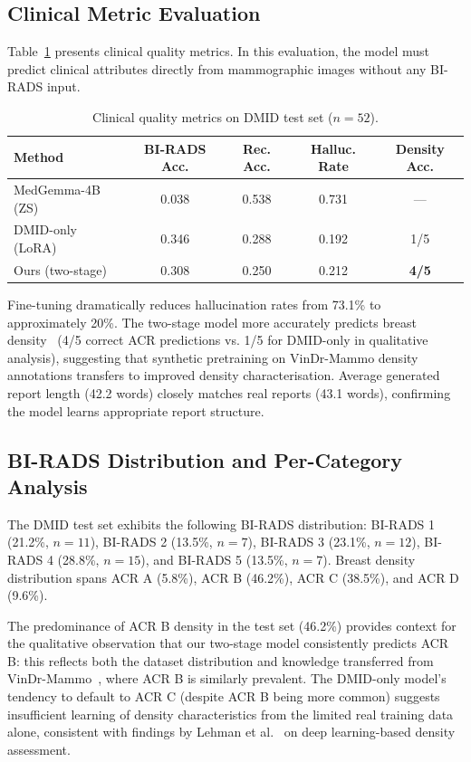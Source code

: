 \documentclass{wlscirep}
\begin{document}
\subsection*{Clinical Metric Evaluation}

Table~\ref{tab:clinical} presents clinical quality metrics. In this evaluation, the model must predict clinical attributes directly from mammographic images without any BI-RADS input.

\begin{table}[H]
\centering
\caption{Clinical quality metrics on DMID test set ($n=52$).}
\label{tab:clinical}
\begin{tabular}{lcccc}
\toprule
\textbf{Method} & \textbf{BI-RADS Acc.} & \textbf{Rec. Acc.} & \textbf{Halluc. Rate} & \textbf{Density Acc.} \\
\midrule
MedGemma-4B (ZS)     & 0.038 & 0.538 & 0.731 & ---   \\
DMID-only (LoRA)      & 0.346 & 0.288 & 0.192 & 1/5   \\
Ours (two-stage)      & 0.308 & 0.250 & 0.212 & \textbf{4/5}  \\
\bottomrule
\end{tabular}
\end{table}

Fine-tuning dramatically reduces hallucination rates from 73.1\% to approximately 20\%. The two-stage model more accurately predicts breast density~\cite{gastounioti2022breast} (4/5 correct ACR predictions vs. 1/5 for DMID-only in qualitative analysis), suggesting that synthetic pretraining on VinDr-Mammo density annotations transfers to improved density characterisation. Average generated report length (42.2 words) closely matches real reports (43.1 words), confirming the model learns appropriate report structure.

\subsection*{BI-RADS Distribution and Per-Category Analysis}

The DMID test set exhibits the following BI-RADS distribution: BI-RADS 1 (21.2\%, $n=11$), BI-RADS 2 (13.5\%, $n=7$), BI-RADS 3 (23.1\%, $n=12$), BI-RADS 4 (28.8\%, $n=15$), and BI-RADS 5 (13.5\%, $n=7$). Breast density distribution spans ACR A (5.8\%), ACR B (46.2\%), ACR C (38.5\%), and ACR D (9.6\%).

The predominance of ACR B density in the test set (46.2\%) provides context for the qualitative observation that our two-stage model consistently predicts ACR B: this reflects both the dataset distribution and knowledge transferred from VinDr-Mammo~\cite{nguyen2023vindr}, where ACR B is similarly prevalent. The DMID-only model's tendency to default to ACR C (despite ACR B being more common) suggests insufficient learning of density characteristics from the limited real training data alone, consistent with findings by Lehman et al.~\cite{lehman2019mammographic} on deep learning-based density assessment.
\end{document}
